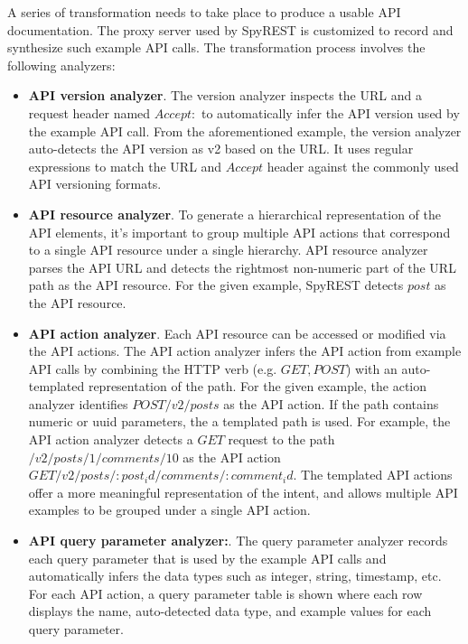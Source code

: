 \documentclass[10pt, conference]{IEEEtran}
\begin{document}
A series of transformation needs to take place to produce a usable API documentation. The proxy server used by SpyREST is customized to record and synthesize such example API calls. The transformation process involves the following analyzers:

\begin{itemize}
  \item \textbf{API version analyzer}. The version analyzer inspects the URL and a request header named $Accept: $ to automatically infer the API version used by the example API call. From the aforementioned example, the version analyzer auto-detects the API version as v2 based on the URL. It uses regular expressions to match the URL and $Accept$ header against the commonly used API versioning formats.

  \item \textbf{API resource analyzer}. To generate a hierarchical representation of the API elements, it's important to group multiple API actions that correspond to a single API resource under a single hierarchy. API resource analyzer parses the API URL and detects the rightmost non-numeric part of the URL path as the API resource. For the given example, SpyREST detects $post$ as the API resource.

  \item \textbf{API action analyzer}. Each API resource can be accessed or modified via the API actions. The API action analyzer infers the API action from example API calls by combining the HTTP verb (e.g. $GET, POST$) with an auto-templated representation of the path. For the given example, the action analyzer identifies $POST /v2/posts$ as the API action. If the path contains numeric or uuid parameters, the a templated path is used. For example, the API action analyzer detects a $GET$ request to the path $/v2/posts/1/comments/10$ as the API action $GET /v2/posts/:post_id/comments/:comment_id$. The templated API actions offer a more meaningful representation of the intent, and allows multiple API examples to be grouped under a single API action.

  \item \textbf{API query parameter analyzer:}. The query parameter analyzer records each query parameter that is used by the example API calls and automatically infers the data types such as integer, string, timestamp, etc. For each API action, a query parameter table is shown where each row displays the name, auto-detected data type, and example values for each query parameter.


\end{itemize}
\end{document}
